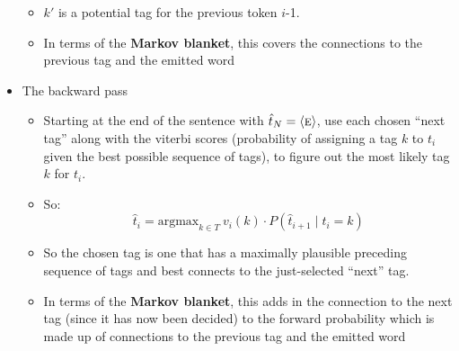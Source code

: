 \documentclass[11pt,letterpaper]{article}
\newcommand{\ngramend}{\ensuremath{\langle \textsc{e} \rangle}}
\newcommand{\tcurr}{\ensuremath{t_i}}
\begin{document}
\begin{itemize}
\begin{itemize}
      \item $k'$ is a potential tag for the previous token $i$-1.
      \item In terms of the \textbf{Markov blanket}, this covers the connections to the previous tag and the emitted word
    \end{itemize}
  \item The backward pass
    \begin{itemize}
      \item Starting at the end of the sentence with $\hat{t}_N=\ngramend$, use each chosen ``next tag'' along with the viterbi scores (probability of assigning a tag $k$ to $t_i$ given the best possible sequence of tags), to figure out the most likely tag $k$ for $t_i$.
      \item So:
        \[
          \hat{t}_i = \text{argmax}_{k \in T}~v_{i}(k) \cdot P(\hat{t}_{i+1} \mid t_i=k)
        \]
      \item So the chosen tag is one that has a maximally plausible preceding sequence of tags and best connects to the just-selected ``next'' tag.
      \item In terms of the \textbf{Markov blanket}, this adds in the connection to the next tag (since it has now been decided) to the forward probability which is made up of connections to the previous tag and the emitted word
    \end{itemize}
\end{itemize}
\end{document}
